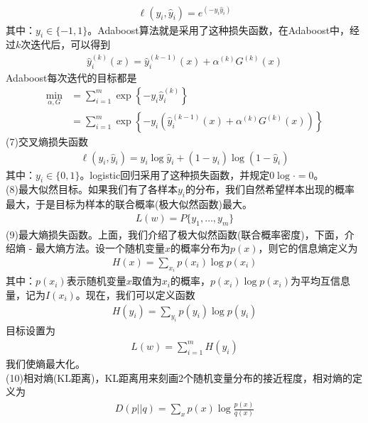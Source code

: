         \begin{align*}
        \ell(y_i,\hat{y}_i) = e^{(-y_i\hat{y}_i)}
        \end{align*}
        其中：$y_i\in \{-1,1\}$。Adaboost算法就是采用了这种损失函数，在Adaboost中，经过$k$次迭代后，可以得到
        \begin{align*}
        \hat{y}_i^{(k)}(x) = \hat{y}_i^{(k-1)}(x) + \alpha^{(k)} G^{(k)}(x)
        \end{align*}
        Adaboost每次迭代的目标都是
        \begin{align*}
        \min_{\alpha,G} &= \sum_{i=1}^m \exp\left\{-y_i\hat{y}_i^{(k)}\right\} \\
        &= \sum_{i=1}^m\exp \left\{-y_i\left(\hat{y}_i^{(k-1)}(x) + \alpha^{(k)} G^{(k)}(x)\right)\right\}
        \end{align*}
        (7)交叉熵损失函数
        \begin{align*}
        \ell(y_i,\hat{y}_i) = y_i\log \hat{y}_i+(1-y_i)\log(1-\hat{y}_i)
        \end{align*}
        其中：$y_i \in \{0,1\}$。logistic回归采用了这种损失函数，并规定$0\log \cdot = 0$。\\
        (8)最大似然目标。如果我们有了各样本$y_i$的分布，我们自然希望样本出现的概率最大，于是目标为样本的联合概率(极大似然函数)最大。
        \begin{align*}
        L(w) = P\{y_1,\dots,y_m\}
        \end{align*}
        (9)最大熵损失函数。上面，我们介绍了极大似然函数(联合概率密度)，下面，介绍熵 - 最大熵方法。设一个随机变量$x$的概率分布为$p(x)$，则它的信息熵定义为
        \begin{align*}
        H(x) = \sum_{x_i} p(x_i)\log p(x_i)
        \end{align*}
        其中：$p(x_i)$表示随机变量$x$取值为$x_i$的概率，$p(x_i)\log p(x_i)$为平均互信息量，记为$I(x_i)$。现在，我们可以定义函数
        \begin{align*}
        H(y_i) = \sum_{y_i} p(y_i)\log p(y_i)
        \end{align*}
        目标设置为
        \begin{align*}
        L(w) = \sum_{i=1}^mH(y_i)
        \end{align*}
        我们使熵最大化。\\
        (10)相对熵(KL距离)，KL距离用来刻画2个随机变量分布的接近程度，相对熵的定义为
        \begin{align*}
        D(p||q) = \sum_x p(x)\log \frac{p(x)}{q(x)}
        \end{align*}
